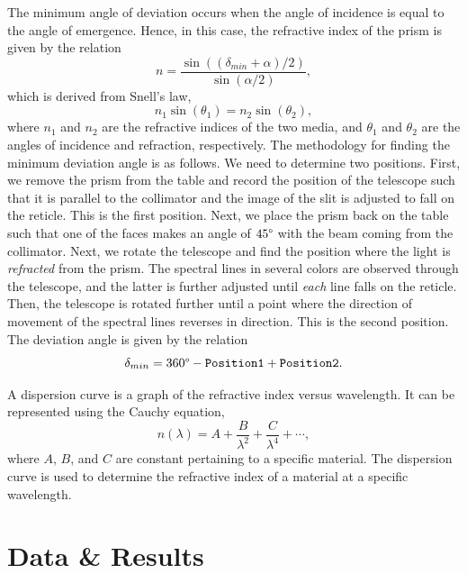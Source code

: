 \documentclass[10pt]{article}
\begin{document}
The minimum angle of deviation occurs when the angle of incidence is equal to the angle of emergence. Hence, in this case, the refractive index of the prism is given by the relation
\begin{equation}
    \label{eq:1}
    n = \frac{\sin\left((\delta_{min}+\alpha) / 2 \right)}{\sin\left(\alpha / 2\right)},
\end{equation}
which is derived from Snell's law\cite[]{Hecht_2017},
\begin{equation}
    n_1 \sin(\theta_1) = n_2 \sin(\theta_2),
\end{equation}
where $n_1$ and $n_2$ are the refractive indices of the two media, and $\theta_1$ and $\theta_2$ are the angles of incidence and refraction, respectively. The methodology for finding the minimum deviation angle is as follows. We need to determine two positions. First, we remove the prism from the table and record the position of the telescope such that it is parallel to the collimator and the image of the slit is adjusted to fall on the reticle. This is the first position. Next, we place the prism back on the table such that one of the faces makes an angle of $45\degree$ with the beam coming from the collimator. Next, we rotate the telescope and find the position where the light is \textit{refracted} from the prism. The spectral lines in several colors are observed through the telescope, and the latter is further adjusted until \textit{each} line falls on the reticle. Then, the telescope is rotated further until a point where the direction of movement of the spectral lines reverses in direction. This is the second position. The deviation angle is given by the relation
\begin{equation}
    \delta_{min} = 360\degree - \texttt{Position1} + \texttt{Position2}.
\end{equation}

A dispersion curve is a graph of the refractive index versus wavelength. It can be represented using the Cauchy equation\cite[]{Pedrotti_2013},
\begin{equation}
    n(\lambda) = A + \frac{B}{\lambda^2} + \frac{C}{\lambda^4} + \cdots,
\end{equation}
where $A$, $B$, and $C$ are constant pertaining to a specific material. The dispersion curve is used to determine the refractive index of a material at a specific wavelength.

\section{Data \& Results}
\end{document}
